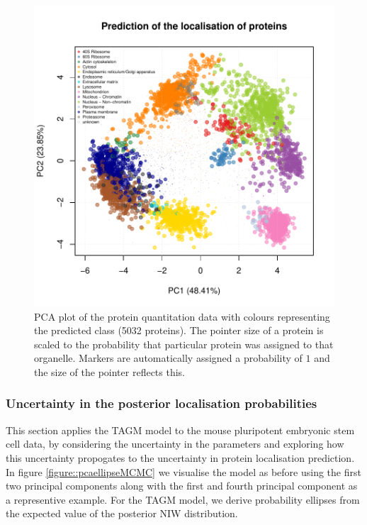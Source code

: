 \documentclass[12pt,english]{article}
\begin{document}
\begin{figure}[ht]
\includegraphics{tagm-005}

  \centering
  \caption{PCA plot of the protein quantitation data with colours representing
    the predicted class (5032 proteins). The pointer size of a protein is scaled to
    the probability that particular protein was assigned to that organelle. Markers
are automatically assigned a probability of $1$ and the size of the pointer reflects this.}
  \label{fig:assignmentPCAMAP}
\end{figure}


\clearpage

\subsubsection{Uncertainty in the posterior localisation probabilities}
This section applies the TAGM model to the mouse pluripotent embryonic stem cell data,
by considering the uncertainty in the parameters and exploring how this uncertainty propogates
to the uncertainty in protein localisation prediction.
In figure \ref{figure::pcaellipseMCMC} we visualise the model as before using the first two principal components along with the first and fourth
principal component as a representive example.
For the TAGM model, we derive probability ellipses from the expected value
of the posterior NIW distribution.
\end{document}
